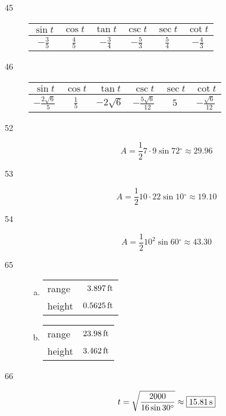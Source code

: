 \documentclass{exam}
\newcommand{\dg}{\ensuremath{^\circ}}
\begin{document}
\begin{description}
      \item[45]
        \begin{tabular}[H]{cccccc}
          \toprule
          $\sin t$       & $\cos t$      & $\tan t$       & $\csc t$       & $\sec t$      & $\cot t$ \\
          \midrule
          $-\frac{3}{5}$ & $\frac{4}{5}$ & $-\frac{3}{4}$ & $-\frac{5}{3}$ & $\frac{5}{4}$ & $-\frac{4}{3}$ \\
          \bottomrule
        \end{tabular}

      \item[46]
        \begin{tabular}[H]{cccccc}
          \toprule
          $\sin t$                & $\cos t$      & $\tan t$      & $\csc t$                 & $\sec t$ & $\cot t$ \\
          \midrule
          $-\frac{2 \sqrt{6}}{5}$ & $\frac{1}{5}$ & $-2 \sqrt{6}$ & $-\frac{5 \sqrt{6}}{12}$ & $5$      & $-\frac{\sqrt{6}}{12}$ \\
          \bottomrule
        \end{tabular}

      \item[52]
        \[
          A = \frac{1}{2} 7 \cdot 9 \sin 72 \dg \approx \boxed{ 29.96 }
        \]

      \item[53]
        \[
          A = \frac{1}{2} 10 \cdot 22 \sin 10 \dg \approx \boxed{ 19.10 }
        \]

      \item[54]
        \[
          A = \frac{1}{2} 10^2 \sin 60 \dg \approx \boxed{ 43.30 }
        \]

      \item[65]
        \begin{enumerate}[(a)]
          \item 
            \begin{tabular}[H]{lr}
              \toprule
              range  & $\unit[3.897]{ft}$ \\
              height & $\unit[0.5625]{ft}$ \\
              \bottomrule
            \end{tabular}

          \item 
            \begin{tabular}[H]{lr}
              \toprule
              range  & $\unit[23.98]{ft}$ \\
              height & $\unit[3.462]{ft}$ \\
              \bottomrule
            \end{tabular}
        \end{enumerate}

      \item[66]
        \[
          t = \sqrt{ \frac{2000}{16 \sin 30 \dg}} \approx \boxed{ \unit[15.81]{s} }
        \]

    \end{description}
\end{document}
